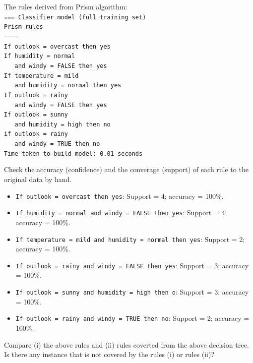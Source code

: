 \documentclass[12pt,twoside]{article}
\begin{document}
\begin{exercises}
\begin{exerciseparts}
\ifsolution \solution{}
The rules derived from Prism algorithm: \\
\texttt{=== Classifier model (full training set)} \\
\texttt{Prism rules} \\
\texttt{-----------} \\
\texttt{If outlook = overcast then yes} \\
\texttt{If humidity = normal} \\
\texttt{~~~and windy = FALSE then yes} \\
\texttt{If temperature = mild} \\
\texttt{~~~and humidity = normal then yes} \\
\texttt{If outlook = rainy} \\
\texttt{~~~and windy = FALSE then yes} \\
\texttt{If outlook = sunny} \\
\texttt{~~~and humidity = high then no} \\
\texttt{if outlook = rainy} \\
\texttt{~~~and windy = TRUE then no} \\
\texttt{Time taken to build model: 0.01 seconds}
\fi

\exercisepart
Check the accuracy (confidence) and the converage
(support) of each rule to the original data by hand.

\ifsolution \solution{}
\begin{itemize}
  \item \texttt{If outlook = overcast then yes}: Support = 4; accuracy = 100\%.
  \item \texttt{If humidity = normal and windy = FALSE then yes}: Support = 4; accuracy = 100\%.
  \item \texttt{If temperature = mild and humidity = normal then yes}: Support = 2; accuracy = 100\%.
  \item \texttt{If outlook = rainy and windy = FALSE then yes}: Support = 3; accuracy = 100\%.
  \item \texttt{If outlook = sunny and humidity = high then o}: Support = 3; accuracy = 100\%.
  \item \texttt{If outlook = rainy and windy = TRUE then no}: Support = 2; accuracy = 100\%.
\end{itemize}
\fi

\exercisepart
Compare (i) the above rules and (ii) rules coverted from the above
decision tree. Is there any instance that is not covered by the 
rules (i) or rules (ii)?


\end{exerciseparts}
\end{exercises}
\end{document}
